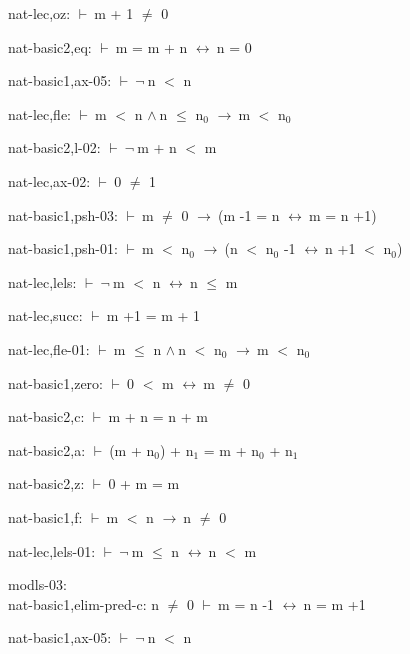 \documentclass[a4paper]{article}
\newcommand{\Fol}{\mbox{$\vdash\ $}}
\newcommand{\Not}{\mbox{$\neg\ $}}
\newcommand{\And}{\mbox{$\wedge\ $}}
\newcommand{\Imp}{\mbox{$\rightarrow\ $}}
\newcommand{\Equiv}{\mbox{$\leftrightarrow\ $}}
\begin{document}
nat-lec,oz: 
 \Fol m + 1 $\neq$ 0



nat-basic2,eq: 
 \Fol m = m + n \Equiv n = 0



nat-basic1,ax-05: 
 \Fol \Not n $<$ n



nat-lec,fle: 
 \Fol m $<$ n \And n $\le$ $\mbox{n}_{0}$ \Imp m $<$ $\mbox{n}_{0}$



nat-basic2,l-02: 
 \Fol \Not m + n $<$ m



nat-lec,ax-02: 
 \Fol 0 $\neq$ 1



nat-basic1,psh-03: 
 \Fol m $\neq$ 0 \Imp (m -1 = n \Equiv m = n +1)



nat-basic1,psh-01: 
 \Fol m $<$ $\mbox{n}_{0}$ \Imp (n $<$ $\mbox{n}_{0}$ -1 \Equiv n +1 $<$ $\mbox{n}_{0}$)



nat-lec,lels: 
 \Fol \Not m $<$ n \Equiv n $\le$ m



nat-lec,succ: 
 \Fol m +1 = m + 1



nat-lec,fle-01: 
 \Fol m $\le$ n \And n $<$ $\mbox{n}_{0}$ \Imp m $<$ $\mbox{n}_{0}$



nat-basic1,zero: 
 \Fol 0 $<$ m \Equiv m $\neq$ 0



nat-basic2,c: 
 \Fol m + n = n + m



nat-basic2,a: 
 \Fol (m + $\mbox{n}_{0}$) + $\mbox{n}_{1}$ = m + $\mbox{n}_{0}$ + $\mbox{n}_{1}$



nat-basic2,z: 
 \Fol 0 + m = m



nat-basic1,f: 
 \Fol m $<$ n \Imp n $\neq$ 0



nat-lec,lels-01: 
 \Fol \Not m $\le$ n \Equiv n $<$ m



\bigskip

modls-03:\\ nat-basic1,elim-pred-c: 
n $\neq$ 0
 \Fol m = n -1 \Equiv n = m +1



nat-basic1,ax-05: 
 \Fol \Not n $<$ n
\end{document}
